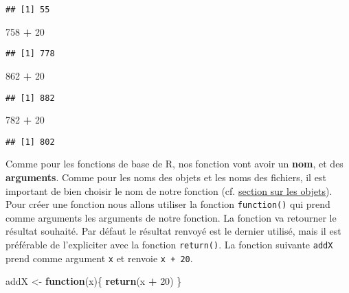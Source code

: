 \documentclass[]{book}
\newenvironment{Shaded}{\begin{snugshade}}{\end{snugshade}}
\newcommand{\KeywordTok}[1]{\textcolor[rgb]{0.13,0.29,0.53}{\textbf{#1}}}
\newcommand{\DecValTok}[1]{\textcolor[rgb]{0.00,0.00,0.81}{#1}}
\newcommand{\StringTok}[1]{\textcolor[rgb]{0.31,0.60,0.02}{#1}}
\newcommand{\ControlFlowTok}[1]{\textcolor[rgb]{0.13,0.29,0.53}{\textbf{#1}}}
\newcommand{\OperatorTok}[1]{\textcolor[rgb]{0.81,0.36,0.00}{\textbf{#1}}}
\newcommand{\NormalTok}[1]{#1}
\theoremstyle{definition}
\theoremstyle{definition}
\theoremstyle{definition}
\theoremstyle{remark}
\begin{document}
\begin{verbatim}
## [1] 55
\end{verbatim}

\begin{Shaded}
\begin{Highlighting}[]
\DecValTok{758} \OperatorTok{+}\StringTok{ }\DecValTok{20}
\end{Highlighting}
\end{Shaded}

\begin{verbatim}
## [1] 778
\end{verbatim}

\begin{Shaded}
\begin{Highlighting}[]
\DecValTok{862} \OperatorTok{+}\StringTok{ }\DecValTok{20}
\end{Highlighting}
\end{Shaded}

\begin{verbatim}
## [1] 882
\end{verbatim}

\begin{Shaded}
\begin{Highlighting}[]
\DecValTok{782} \OperatorTok{+}\StringTok{ }\DecValTok{20}
\end{Highlighting}
\end{Shaded}

\begin{verbatim}
## [1] 802
\end{verbatim}

Comme pour les fonctions de base de R, nos fonction vont avoir un
\textbf{nom}, et des \textbf{arguments}. Comme pour les noms des objets
et les noms des fichiers, il est important de bien choisir le nom de
notre fonction (cf. \protect\hyperlink{l011object}{section sur les
objets}). Pour créer une fonction nous allons utiliser la fonction
\texttt{function()} qui prend comme arguments les arguments de notre
fonction. La fonction va retourner le résultat souhaité. Par défaut le
résultat renvoyé est le dernier utilisé, mais il est préférable de
l'expliciter avec la fonction \texttt{return()}. La fonction suivante
\texttt{addX} prend comme argument \texttt{x} et renvoie
\texttt{x\ +\ 20}.

\begin{Shaded}
\begin{Highlighting}[]
\NormalTok{addX <-}\StringTok{ }\ControlFlowTok{function}\NormalTok{(x)\{}
  \KeywordTok{return}\NormalTok{(x }\OperatorTok{+}\StringTok{ }\DecValTok{20}\NormalTok{)}
\NormalTok{\}}
\end{Highlighting}
\end{Shaded}
\end{document}
